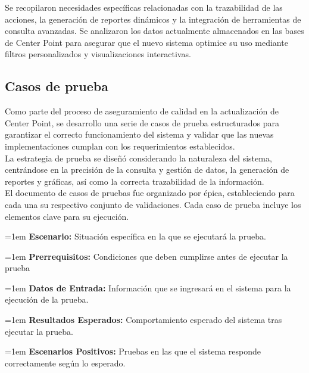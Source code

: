 \documentclass[12pt,letterpaper,spanish, xcolor=table]{report}
\numberwithin{figure}{subsection}
\begin{document}
	Se recopilaron necesidades específicas relacionadas con la trazabilidad de las acciones, la generación de reportes dinámicos y la integración de herramientas de consulta avanzadas. Se analizaron los datos actualmente almacenados en las bases de Center Point para asegurar que el nuevo sistema optimice su uso mediante filtros personalizados y visualizaciones interactivas.\\
	
\subsection{Casos de prueba}
	
	Como parte del proceso de aseguramiento de calidad en la actualización de Center Point, se desarrollo una serie de casos de prueba estructurados para garantizar el correcto funcionamiento del sistema y validar que las nuevas implementaciones cumplan con los requerimientos establecidos.\\
	
	La estrategia de prueba se diseñó considerando la naturaleza del sistema, centrándose en la precisión de la consulta y gestión de datos, la generación de reportes y gráficas, así como la correcta trazabilidad de la información.\\
	
	El documento de casos de pruebas fue organizado por épica, estableciendo para cada una su respectivo conjunto de validaciones. Cada caso de prueba incluye los elementos clave para su ejecución. \\
	
	{\leftskip=1em 
		\noindent 
		\textbf{Escenario:} Situación específica en la que se ejecutará la prueba.
	\par}
	
	{\leftskip=1em 
		\noindent 
		\textbf{Prerrequisitos:} Condiciones que deben cumplirse antes de ejecutar la prueba
	\par}
	
	{\leftskip=1em 
		\noindent 
		\textbf{Datos de Entrada:} Información que se ingresará en el sistema para la ejecución de la prueba.
	\par}
	
	{\leftskip=1em 
		\noindent 
		\textbf{Resultados Esperados:} Comportamiento esperado del sistema tras ejecutar la prueba.
	\par}
	
	{\leftskip=1em 
		\noindent 
		\textbf{Escenarios Positivos:} Pruebas en las que el sistema responde correctamente según lo esperado.
	\par}
	
\end{document}

